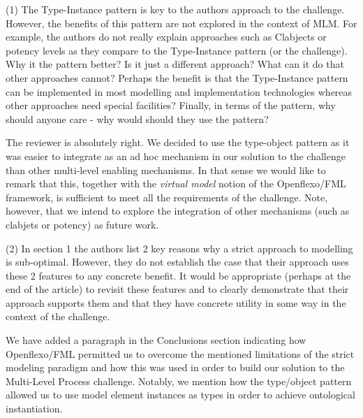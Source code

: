 \documentclass[10pt]{article}
\begin{document}
\pagebreak


\begin{response}{(1) The Type-Instance pattern is key to the authors approach to the challenge. However, the benefits of this pattern are not explored in the context of MLM. For example, the authors do not really explain approaches such as Clabjects or potency levels as they compare to the Type-Instance pattern (or the challenge). Why it the pattern better? Is it just a different approach? What can it do that other approaches cannot? Perhaps the benefit is that the Type-Instance pattern can be implemented in most modelling and implementation technologies whereas other approaches need special facilities? Finally, in terms of the pattern, why should anyone care - why would should they use the pattern?}

The reviewer is absolutely right. We decided to use the type-object pattern as it was easier to integrate as an ad hoc mechanism in our solution to the challenge than other multi-level enabling mechanisms. In that sense we would like to remark that this, together with the \emph{virtual model} notion of the Openflexo/FML framework, is sufficient to meet all the requirements of the challenge. Note, however, that we intend to explore the integration of other mechanisms (such as clabjets or potency) as future work.%

\end{response}

\begin{response}{(2) In section 1 the authors list 2 key reasons why a strict approach to modelling is sub-optimal. However, they do not establish the case that their approach uses these 2 features to any concrete benefit. It would be appropriate (perhaps at the end of the article) to revisit these features and to clearly demonstrate that their approach supports them and that they have concrete utility in some way in the context of the challenge.}

We have added a paragraph in the Conclusions section indicating how Openflexo/FML permitted us to overcome the mentioned limitations of the strict modeling paradigm and how this was used in order to build our solution to the Multi-Level Process challenge. Notably, we mention how the type/object pattern allowed us to use model element instances as types in order to achieve ontological instantiation.
\end{response}
\end{document}
